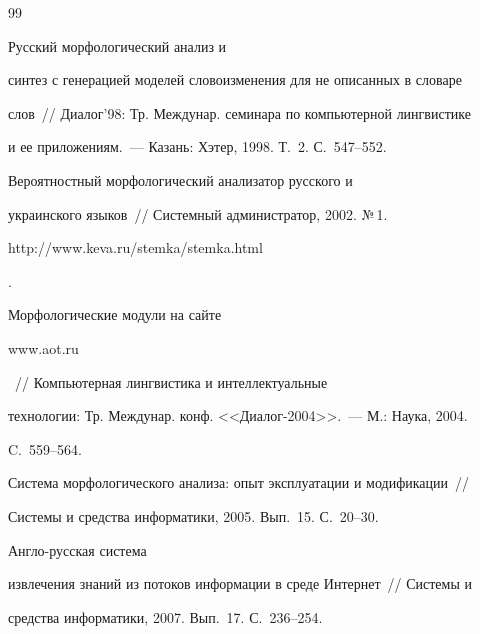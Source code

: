 {\small\frenchspacing

{%



\begin{thebibliography}{99}



\vspace*{-2pt}




     Русский морфологический анализ и

синтез с генерацией моделей словоизменения для не описанных в словаре

слов~/\!\!/ Диалог'98: Тр. Междунар. семинара по компьютерной лингвистике

и ее приложениям.~--- Казань: Хэтер, 1998. Т.~2. С.~547--552.


 Вероятностный морфологический анализатор русского и

украинского языков~/\!\!/ Системный администратор, 2002. №\,1. {\sf

http://www.\linebreak keva.ru/stemka/stemka.html}.


     Морфологические модули на сайте {\sf

www.aot.ru}~/\!\!/  Компьютерная лингвистика и интеллектуальные

технологии: Тр. Междунар. конф. <<Диалог-2004>>.~--- М.: Наука, 2004.

C.~559--564.



Система морфологического анализа: опыт эксплуатации и модификации~/\!\!/

Системы и средства информатики, 2005. Вып.~15. С.~20--30.


     Анг\-ло-рус\-ская сис\-те\-ма

извлечения знаний из потоков информации в среде Интернет~/\!\!/ Системы и

средства информатики, 2007. Вып.~17. С.~236--254.




\end{thebibliography}}}
